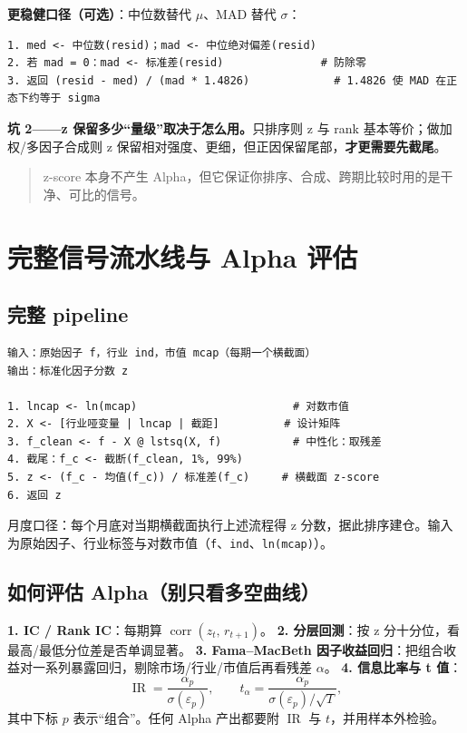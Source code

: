 \documentclass[UTF8,11pt]{ctexart}
\newcommand{\codeinl}[1]{\texttt{#1}}
\begin{document}
\textbf{更稳健口径（可选）}：中位数替代 $\mu$、MAD 替代 $\sigma$：
\begin{lstlisting}[language={},caption={稳健 z-score（伪代码）}]
1. med <- 中位数(resid)；mad <- 中位绝对偏差(resid)
2. 若 mad = 0：mad <- 标准差(resid)               # 防除零
3. 返回 (resid - med) / (mad * 1.4826)             # 1.4826 使 MAD 在正态下约等于 sigma
\end{lstlisting}

\textbf{坑 2——z 保留多少“量级”取决于怎么用。}只排序则 z 与 rank 基本等价；做加权/多因子合成则 z 保留相对强度、更细，但正因保留尾部，\textbf{才更需要先截尾}。

\begin{quote}
z-score 本身不产生 Alpha，但它保证你排序、合成、跨期比较时用的是干净、可比的信号。
\end{quote}

\section{完整信号流水线与 Alpha 评估}

\subsection{完整 pipeline}
\begin{lstlisting}[language={},caption={因子流水线（伪代码）}]
输入：原始因子 f，行业 ind，市值 mcap（每期一个横截面）
输出：标准化因子分数 z

1. lncap <- ln(mcap)                        # 对数市值
2. X <- [行业哑变量 | lncap | 截距]          # 设计矩阵
3. f_clean <- f - X @ lstsq(X, f)           # 中性化：取残差
4. 截尾：f_c <- 截断(f_clean, 1%, 99%)
5. z <- (f_c - 均值(f_c)) / 标准差(f_c)     # 横截面 z-score
6. 返回 z
\end{lstlisting}
月度口径：每个月底对当期横截面执行上述流程得 z 分数，据此排序建仓。输入为原始因子、行业标签与对数市值（\codeinl{f}、\codeinl{ind}、\codeinl{ln(mcap)}）。

\subsection{如何评估 Alpha（别只看多空曲线）}
\textbf{1. IC / Rank IC}：每期算 $\operatorname{corr}(z_t,\,r_{t+1})$。
\textbf{2. 分层回测}：按 z 分十分位，看最高/最低分位差是否单调显著。
\textbf{3. Fama--MacBeth 因子收益回归}：把组合收益对一系列暴露回归，剔除市场/行业/市值后再看残差 $\alpha$。
\textbf{4. 信息比率与 t 值}：
\begin{equation}
\operatorname{IR}=\frac{\alpha_p}{\sigma(\varepsilon_p)},\qquad
t_\alpha=\frac{\alpha_p}{\sigma(\varepsilon_p)/\sqrt{T}},
\end{equation}
其中下标 $p$ 表示“组合”。任何 Alpha 产出都要附 $\operatorname{IR}$ 与 $t$，并用样本外检验。
\end{document}

